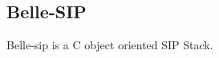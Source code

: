 \documentclass[a4paper]{article}
\begin{document}
%

\subsection{Belle-SIP}

Belle-sip is a C object oriented SIP Stack.

%
%
%
%
%
\end{document}
